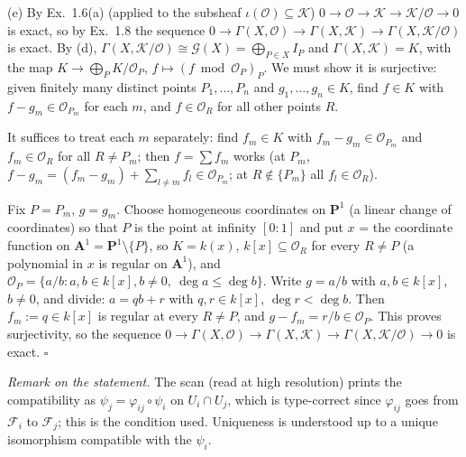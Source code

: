 \documentclass[11pt]{article}
\begin{document}
(e) By Ex.~1.6(a) (applied to the subsheaf $\iota(\mathcal O)\subseteq\mathcal K$) $0\to\mathcal O\to\mathcal K\to\mathcal K/\mathcal O\to0$ is exact, so by Ex.~1.8 the sequence $0\to\Gamma(X,\mathcal O)\to\Gamma(X,\mathcal K)\to\Gamma(X,\mathcal K/\mathcal O)$ is exact. By (d), $\Gamma(X,\mathcal K/\mathcal O)\cong\mathcal G(X)=\bigoplus_{P\in X}I_P$ and $\Gamma(X,\mathcal K)=K$, with the map $K\to\bigoplus_PK/\mathcal O_P$, $f\mapsto(f\bmod\mathcal O_P)_P$. We must show it is surjective: given finitely many distinct points $P_1,\dots,P_n$ and $g_1,\dots,g_n\in K$, find $f\in K$ with $f-g_m\in\mathcal O_{P_m}$ for each $m$, and $f\in\mathcal O_R$ for all other points $R$.

It suffices to treat each $m$ separately: find $f_m\in K$ with $f_m-g_m\in\mathcal O_{P_m}$ and $f_m\in\mathcal O_R$ for all $R\ne P_m$; then $f=\sum f_m$ works (at $P_m$, $f-g_m=(f_m-g_m)+\sum_{l\ne m}f_l\in\mathcal O_{P_m}$; at $R\notin\{P_m\}$ all $f_l\in\mathcal O_R$).

Fix $P=P_m$, $g=g_m$. Choose homogeneous coordinates on $\mathbf P^1$ (a linear change of coordinates) so that $P$ is the point at infinity $[0:1]$ and put $x$ = the coordinate function on $\mathbf A^1=\mathbf P^1\setminus\{P\}$, so $K=k(x)$, $k[x]\subseteq\mathcal O_R$ for every $R\ne P$ (a polynomial in $x$ is regular on $\mathbf A^1$), and $\mathcal O_P=\{a/b: a,b\in k[x], b\ne0,\ \deg a\le\deg b\}$. Write $g=a/b$ with $a,b\in k[x]$, $b\ne0$, and divide: $a=qb+r$ with $q,r\in k[x]$, $\deg r<\deg b$. Then $f_m:=q\in k[x]$ is regular at every $R\ne P$, and $g-f_m=r/b\in\mathcal O_P$. This proves surjectivity, so the sequence $0\to\Gamma(X,\mathcal O)\to\Gamma(X,\mathcal K)\to\Gamma(X,\mathcal K/\mathcal O)\to0$ is exact. \hfill$\square$

\pf
\emph{Remark on the statement.} The scan (read at high resolution) prints the compatibility as $\psi_j=\varphi_{ij}\circ\psi_i$ on $U_i\cap U_j$, which is type-correct since $\varphi_{ij}$ goes from $\mathcal F_i$ to $\mathcal F_j$; this is the condition used. Uniqueness is understood up to a unique isomorphism compatible with the $\psi_i$.
\end{document}
